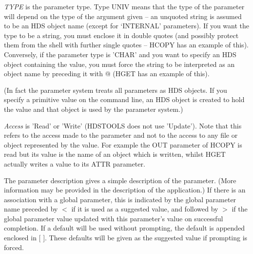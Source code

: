 \documentclass[twoside,11pt]{article}
\renewcommand{\_}{\texttt{\symbol{95}}}
\begin{document}
\textit{TYPE} is the parameter type. Type UNIV means that the type of the
parameter will depend on the type of the argument given -- an unquoted string
is assumed to be an HDS object name (except for `INTERNAL' parameters). 
If you want the type to be a string, you must enclose it in double quotes (and
possibly protect them from the shell with further single quotes -- HCOPY has
an example of this). Conversely, if the parameter type is '\_CHAR' and you want
to specify an HDS object containing the value, you must force the string to be
interpreted as an object name by preceding it with @ (HGET has an example of
this).

(In fact the parameter system treats all parameters as HDS objects. If you
specify a primitive value on the command line, an HDS object is created to
hold the value and that object is used by the parameter system.)

\textit{Access} is 'Read' or 'Write' (HDSTOOLS does not use 'Update'). Note
that this refers to the access made to the parameter and not to the access to
any file or object represented by the value. For example the OUT parameter of
HCOPY is read but its value is the name of an object which is written, whilst
HGET actually writes a value to its ATTR parameter.

The parameter description gives a simple description of the parameter.
(More information may be provided in the description of the application.)
If there is an association with a global parameter, this is indicated by the
global parameter name preceded by $<$ if it is used as a suggested value, and
followed by $>$ if the global parameter value updated with this parameter's
value on successful completion.
If a default will be used without prompting, the default is appended enclosed
in [ ].
These defaults will be given as the suggested value if prompting is forced.
\end{document}
